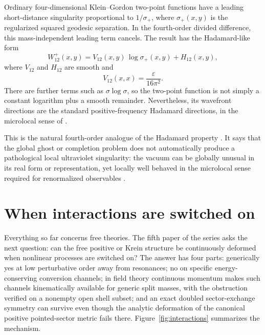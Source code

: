 \documentclass[11pt]{article}
\theoremstyle{remark}
\begin{document}
Ordinary four-dimensional Klein--Gordon two-point functions have a
leading short-distance singularity proportional to $1/\sigma_+$, where
$\sigma_+(x,y)$ is the regularized squared geodesic separation.  In the
fourth-order divided difference, this mass-independent leading term
cancels.  The result has the Hadamard-like form
\begin{equation}
W^+_{12}(x,y)=V_{12}(x,y)\,\log\sigma_+(x,y)+H_{12}(x,y),
\end{equation}
where $V_{12}$ and $H_{12}$ are smooth and
\begin{equation}
V_{12}(x,x)=\frac{\varepsilon}{16\pi^2}.
\end{equation}
There are further terms such as $\sigma\log\sigma$, so the two-point
function is not simply a constant logarithm plus a smooth remainder.
Nevertheless, its wavefront directions are the standard positive-frequency
Hadamard directions, in the microlocal sense of \cite{Radzikowski}.

This is the natural fourth-order analogue of the Hadamard property
\cite{paperIII}.  It says that the global ghost or completion problem
does not automatically produce a pathological local ultraviolet
singularity: the vacuum can be globally unusual in its real form or
representation, yet locally well behaved in the microlocal sense required
for renormalized observables \cite{BrunettiFredenhagen,HollandsWald}.

\section{When interactions are switched on}\label{sec:interactions}

Everything so far concerns free theories.  The fifth paper of the
series \cite{paperV} asks the next question: can the free positive or
Krein structure be continuously deformed when nonlinear processes are
switched on?  The answer has four parts: generically yes at low
perturbative order away from resonances; no on specific
energy-conserving conversion channels; in field theory continuous
momentum makes such channels kinematically available for generic split
masses, with the obstruction verified on a nonempty open shell subset;
and an exact doubled sector-exchange symmetry can survive even though
the analytic deformation of the canonical positive pointed-sector
metric fails there.  Figure~\ref{fig:interactions} summarizes the
mechanism.
\end{document}
